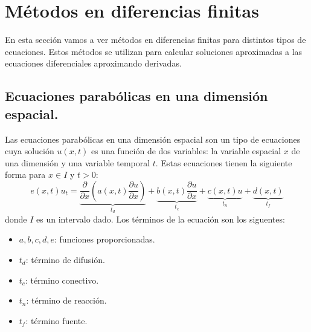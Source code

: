 \section{Métodos en diferencias finitas}
En esta sección vamos a ver métodos en diferencias finitas para distintos tipos de ecuaciones. Estos métodos se utilizan para calcular soluciones aproximadas a las ecuaciones diferenciales aproximando derivadas.

\subsection{Ecuaciones parabólicas en una dimensión espacial.}

Las ecuaciones parabólicas en una dimensión espacial son un tipo de ecuaciones cuya solución $u(x,t)$ es una función de dos variables: la variable espacial $x$ de una dimensión y una variable temporal $t$. Estas ecuaciones tienen la siguiente forma para $x\in I$ y $t>0$:
$$e(x,t)u_t = \underbrace{\frac{\partial}{\partial x} \left(a(x,t)\frac{\partial u}{\partial x}\right)}_{t_d} + \underbrace{b(x,t)\frac{\partial u}{\partial x}}_{t_c}+\underbrace{c(x,t)u}_{t_n} + \underbrace{d(x,t)}_{t_f}$$
donde $I$ es un intervalo dado. Los términos de la ecuación son los siguentes:
\begin{itemize}
	\vspace{-3mm}
	\item $a,b,c,d,e$: funciones proporcionadas.
	\item $t_d$: término de difusión.
	\item $t_c$: término conectivo.
	\item $t_n$: término de reacción.
	\item $t_f$: término fuente.
\end{itemize}

